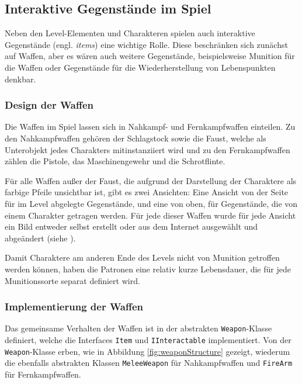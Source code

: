 \subsection{Interaktive Gegenstände im Spiel}
\label{sec:weapon}

Neben den Level-Elementen und Charakteren spielen auch interaktive Gegenstände (engl. \textit{items}) eine wichtige Rolle. Diese beschränken sich zunächst auf Waffen, aber es wären auch weitere Gegenstände, beispielsweise Munition für die Waffen oder Gegenstände für die Wiederherstellung von Lebenspunkten denkbar.

\subsubsection{Design der Waffen}
\label{sec:weaponDesign}

Die Waffen im Spiel lassen sich in Nahkampf- und Fernkampfwaffen einteilen. Zu den Nahkampfwaffen gehören der Schlagstock sowie die Faust, welche als Unterobjekt jedes Charakters mitinstanziiert wird und zu den Fernkampfwaffen zählen die Pistole, das Maschinengewehr und die Schrotflinte.

Für alle Waffen außer der Faust, die aufgrund der Darstellung der Charaktere als farbige Pfeile unsichtbar ist, gibt es zwei Ansichten: Eine Ansicht von der Seite für im Level abgelegte Gegenstände, und eine von oben, für Gegenstände, die von einem Charakter getragen werden. Für jede dieser Waffen wurde für jede Ansicht ein Bild entweder selbst erstellt oder aus dem Internet ausgewählt und abgeändert (siehe \cite{Sprite_Machinegun} \cite{Sprite_Shotgun} \cite{Sprite_Bat}).

Damit Charaktere am anderen Ende des Levels nicht von Munition getroffen werden können, haben die Patronen eine relativ kurze Lebensdauer, die für jede Munitionssorte separat definiert wird.

\subsubsection{Implementierung der Waffen}
\label{sec:weaponImplementation}

Das gemeinsame Verhalten der Waffen ist in der abstrakten \texttt{Weapon}-Klasse definiert, welche die Interfaces \texttt{Item} und \texttt{IInteractable} implementiert. Von der \texttt{Weapon}-Klasse erben, wie in Abbildung \ref{fig:weaponStructure} gezeigt, wiederum die ebenfalls abstrakten Klassen \texttt{MeleeWeapon} für Nahkampfwaffen und \texttt{FireArm} für Fernkampfwaffen.

